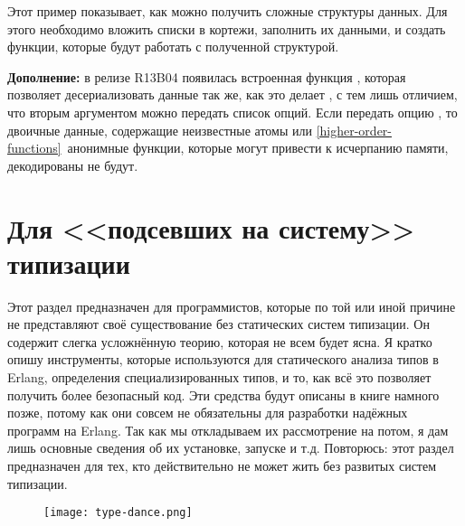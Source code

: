 Этот пример показывает, как можно получить сложные структуры данных.
Для этого необходимо вложить списки в кортежи, заполнить их данными, и создать функции, которые будут работать с полученной структурой.\\
\colorbox{lgray}
{
    \begin{minipage}{\linewidth}
\textbf{Дополнение:}
в релизе R13B04 появилась встроенная функция , которая позволяет десериализовать данные так же, как это делает , с тем лишь отличием, что вторым аргументом можно передать список опций.
Если передать опцию \ops{[safe]}, то двоичные данные, содержащие неизвестные атомы или \ref{higher-order-functions}~анонимные функции, которые могут привести к исчерпанию памяти, декодированы не будут.
    \end{minipage}
}
\section{Для <<подсевших на систему>> типизации}
\label{for-type-junkies}
Этот раздел предназначен для программистов, которые по той или иной причине не представляют своё существование без статических систем типизации.
Он содержит слегка усложнённую теорию, которая не всем будет ясна.
Я кратко опишу инструменты, которые используются для статического анализа типов в Erlang, определения специализированных типов, и то, как всё это позволяет получить более безопасный код.
Эти средства будут описаны в книге намного позже, потому как они совсем не обязательны для разработки надёжных программ на Erlang.
Так как мы откладываем их рассмотрение на потом, я дам лишь основные сведения об их установке, запуске и т.д.
Повторюсь: этот раздел предназначен для тех, кто действительно не может жить без развитых систем типизации.
\begin{figure}[h!]
    \centering
    \texttt{[image: type-dance.png]}
\end{figure} 

